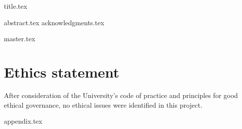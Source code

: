 \documentclass[a4paper, 12pt]{report}
\begin{document}
{title.tex}



\setcounter{tocdepth}{4}




{abstract.tex}
{acknowledgments.tex}


\tableofcontents

\newpage

\listoffigures

\newpage

\listoftables


% 

\printglossary[type=acronym]




\newpage





{master.tex}




\chapter{Ethics statement}

After consideration of the University's code of practice and principles for good ethical governance, no ethical issues were identified in this project. 


{appendix.tex}





\end{document}
